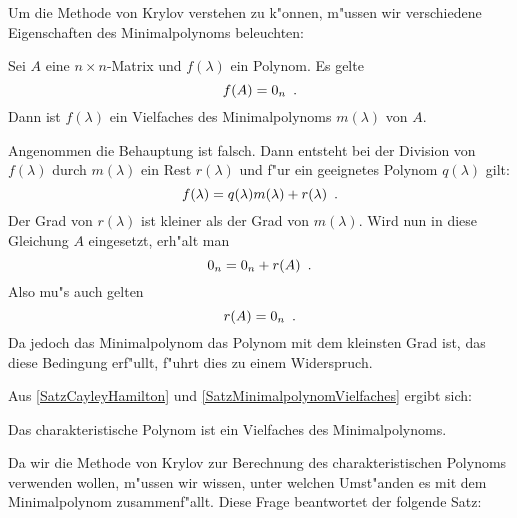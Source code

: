 Um die Methode von Krylov verstehen zu k"onnen, m"ussen wir verschiedene
Eigenschaften des Minimalpolynoms beleuchten:

\begin{satz}
\label{SatzMinimalpolynomVielfaches}
    Sei $A$ eine $n \times n$-Matrix und $f(\lambda)$ ein Polynom. Es
    gelte \[ f(A) = 0_n \mbox{\hspace{0.5em}.} \] Dann ist $f(\lambda)$ ein Vielfaches
    des Minimalpolynoms $m(\lambda)$ von $A$.
\end{satz}
\begin{beweis}
    Angenommen die Behauptung ist falsch. Dann entsteht bei der Division
    von $f(\lambda)$ durch $m(\lambda)$ ein Rest $r(\lambda)$ und f"ur
    ein geeignetes Polynom $q(\lambda)$ gilt:
    \[ f(\lambda) = q(\lambda)m(\lambda) + r(\lambda) \mbox{\hspace{0.5em}.} \]
    Der Grad von $r(\lambda)$ ist kleiner als der Grad von $m(\lambda)$.
    Wird nun in diese Gleichung $A$ eingesetzt, erh"alt man
    \[ 0_n = 0_n + r(A) \mbox{\hspace{0.5em}.} \] Also mu"s auch gelten
    \[ r(A) = 0_n \mbox{\hspace{0.5em}.} \] Da jedoch das Minimalpolynom das Polynom mit
    dem kleinsten Grad ist, das diese Bedingung erf"ullt, f"uhrt dies
    zu einem Widerspruch.
\end{beweis}

Aus \ref{SatzCayleyHamilton} und \ref{SatzMinimalpolynomVielfaches} 
ergibt sich:
\begin{korollar}
\label{SatzVielfaches}
    Das charakteristische Polynom ist ein Vielfaches des Minimalpolynoms.    
\end{korollar}

Da wir die Methode von Krylov zur Berechnung des charakteristischen 
Polynoms verwenden wollen, m"ussen wir wissen, unter welchen Umst"anden
es mit dem Minimalpolynom zusammenf"allt. Diese 
Frage beantwortet der folgende Satz:

